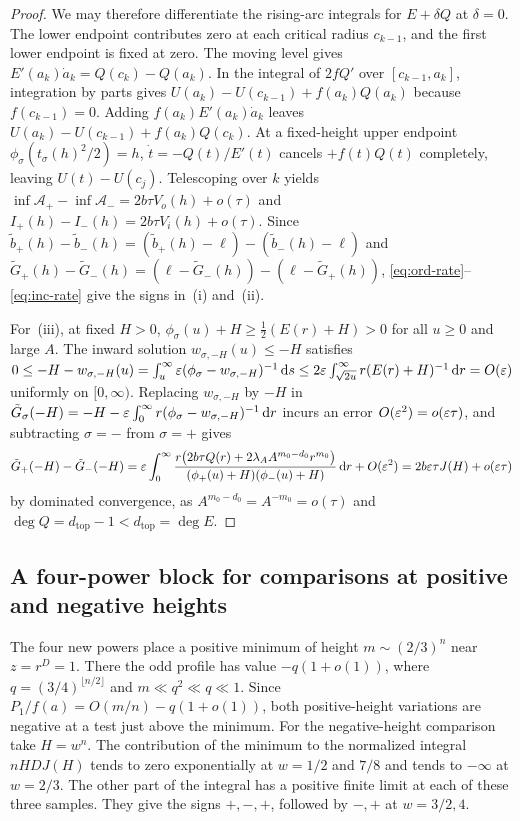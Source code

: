 \begin{proof}
We may therefore differentiate the rising-arc integrals for
$E+\delta Q$ at $\delta=0$. The lower endpoint contributes zero
at each critical radius $c_{k-1}$, and the first lower endpoint is
fixed at zero. The moving level gives
$E'(a_k)\dot a_k=Q(c_k)-Q(a_k)$. In the integral of
$2fQ'$ over $[c_{k-1},a_k]$, integration by parts gives
$U(a_k)-U(c_{k-1})+f(a_k)Q(a_k)$ because $f(c_{k-1})=0$.
Adding $f(a_k)E'(a_k)\dot a_k$ leaves
$U(a_k)-U(c_{k-1})+f(a_k)Q(c_k)$. At a fixed-height upper
endpoint $\phi_\sigma(t_\sigma(h)^2/2)=h$, $\dot{t}=-Q(t)/E'(t)$ cancels $+f(t)Q(t)$ completely,
leaving $U(t)-U(c_j)$. Telescoping over $k$ yields $\inf\mathcal{A}_+-\inf\mathcal{A}_-=2b\tau
V_o(h)+o(\tau)$ and $I_+(h)-I_-(h)=2b\tau V_i(h)+o(\tau)$. Since
$\tilde{b}_+(h)-\tilde{b}_-(h)=(\tilde{b}_+(h)-\ell)-(\tilde{b}_-(h)-\ell)$ and
$\tilde{G}_+(h)-\tilde{G}_-(h)=(\ell-\tilde{G}_-(h))-(\ell-\tilde{G}_+(h))$,
\eqref{eq:ord-rate}--\eqref{eq:inc-rate} give the signs in~(i) and~(ii).

For~(iii), at fixed $H>0$, $\phi_\sigma(u)+H\ge \frac{1}{2}(E(r)+H)>0$ for all $u\ge 0$ and large $A$.
The inward solution $w_{\sigma,-H}(u)\le -H$ satisfies $0\le -H-w_{\sigma,-H}(u)=\int_u^\infty
\varepsilon(\phi_\sigma-w_{\sigma,-H})^{-1}\,\mathrm{d} s\le 2\varepsilon\int_{\sqrt{2u}}^\infty r(E(r)+H)^{-1}\,\mathrm{d} r=O(\varepsilon)$
uniformly on $[0,\infty)$. Replacing $w_{\sigma,-H}$ by $-H$ in
$\tilde{G}_\sigma(-H)=-H-\varepsilon\int_0^\infty r(\phi_\sigma-w_{\sigma,-H})^{-1}\,\mathrm{d} r$ incurs an error
$O(\varepsilon^2)=o(\varepsilon\tau)$, and subtracting $\sigma=-$ from $\sigma=+$ gives
\[
  \tilde{G}_+(-H) - \tilde{G}_-(-H) = \varepsilon\int_0^\infty \frac{r\bigl(2b\tau Q(r) + 2\lambda_A
  A^{m_0-d_0}r^{m_0}\bigr)}{(\phi_+(u)+H)(\phi_-(u)+H)}\,\mathrm{d} r + O(\varepsilon^2) = 2b\varepsilon\tau J(H) +
  o(\varepsilon\tau)
\]
by dominated convergence, as $A^{m_0-d_0}=A^{-m_0}=o(\tau)$ and $\deg Q=d_{\mathrm{top}}-1<d_{\mathrm{top}}=\deg E$.
\end{proof}

\subsection{A four-power block for comparisons at positive and negative heights}\label{subsec:valley-local}
The four new powers place a positive minimum of height $m\sim(2/3)^n$
near $z=r^D=1$. There the odd profile has value $-q(1+o(1))$, where
$q=(3/4)^{\lfloor n/2\rfloor}$ and $m\ll q^2\ll q\ll1$. Since
$P_1/f(a)=O(m/n)-q(1+o(1))$, both positive-height variations are
negative at a test just above the minimum. For the negative-height
comparison take $H=w^n$. The contribution of the minimum to the
normalized integral $nHDJ(H)$ tends to zero exponentially at $w=1/2$
and $7/8$ and tends to $-\infty$ at $w=2/3$. The other part of the
integral has a positive finite limit at each of these three samples.
They give the signs $+,-,+$, followed by $-,+$ at $w=3/2,4$.

